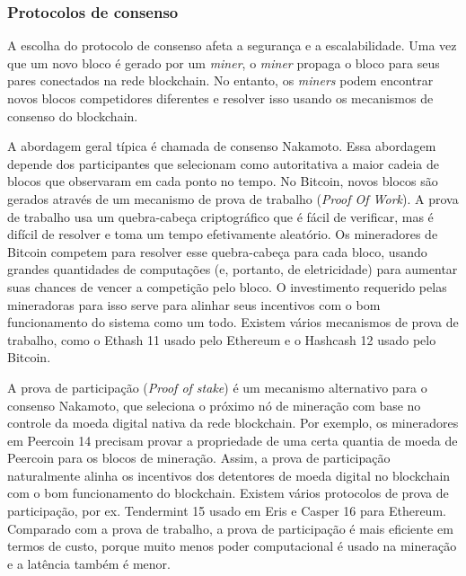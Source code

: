         
        \subsubsection{Protocolos de consenso}

            A escolha do protocolo de consenso afeta a segurança e a escalabilidade. Uma vez que um novo bloco é gerado por um \textit{miner}, o \textit{miner} propaga o bloco para seus pares conectados na rede blockchain. No entanto, os \textit{miners} podem encontrar novos blocos competidores diferentes e resolver isso usando os mecanismos de consenso do blockchain.\cite{architecture_for_blockchain}
            
            A abordagem geral típica é chamada de consenso Nakamoto. Essa abordagem depende dos participantes que selecionam como autoritativa a maior cadeia de blocos que observaram em cada ponto no tempo. No Bitcoin, novos blocos são gerados através de um mecanismo de prova de trabalho (\textit{Proof Of Work}). A prova de trabalho usa um quebra-cabeça criptográfico que é fácil de verificar, mas é difícil de resolver e toma um tempo efetivamente aleatório. Os mineradores de Bitcoin competem para resolver esse quebra-cabeça para cada bloco, usando grandes quantidades de computações (e, portanto, de eletricidade) para aumentar suas chances de vencer a competição pelo bloco. O investimento requerido pelas mineradoras para isso serve para alinhar seus incentivos com o bom funcionamento do sistema como um todo. Existem vários mecanismos de prova de trabalho, como o Ethash 11 usado pelo Ethereum e o Hashcash 12 usado pelo Bitcoin.\cite{architecture_for_blockchain}
            
            A prova de participação (\textit{Proof of stake}) é um mecanismo alternativo para o consenso Nakamoto, que seleciona o próximo nó de mineração com base no controle da moeda digital nativa da rede blockchain. Por exemplo, os mineradores em Peercoin 14 precisam provar a propriedade de uma certa quantia de moeda de Peercoin para os blocos de mineração. Assim, a prova de participação naturalmente alinha os incentivos dos detentores de moeda digital no blockchain com o bom funcionamento do blockchain. Existem vários protocolos de prova de participação, por ex. Tendermint 15 usado em Eris e Casper 16 para Ethereum. Comparado com a prova de trabalho, a prova de participação é mais eficiente em termos de custo, porque muito menos poder computacional é usado na mineração e a latência também é menor.\cite{architecture_for_blockchain}
            
